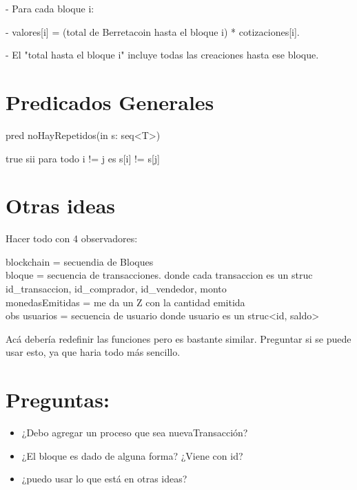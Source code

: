 \documentclass[10pt,a4paper]{article}
\begin{document}
{{    - Para cada bloque i:

    - valores[i] = (total de Berretacoin hasta el bloque i) * cotizaciones[i].

    - El "total hasta el bloque i" incluye todas las creaciones hasta ese bloque.


}


\section{Predicados Generales}
pred noHayRepetidos(in s: seq<T>){

   true sii para todo i != j es s[i] != s[j]
}

\section{Otras ideas}

Hacer todo con 4 observadores:

blockchain = secuendia de Bloques\\

bloque = secuencia de transacciones. donde cada transaccion es un struc \< id_transaccion, id_comprador, id_vendedor, monto \> \\

monedasEmitidas = me da un Z con la cantidad emitida\\

obs usuarios = secuencia de usuario donde usuario es un struc<id, saldo>

Acá debería redefinir las funciones pero es bastante similar. Preguntar si se puede usar esto, ya que haria todo más sencillo.




\section{Preguntas:}

\begin{itemize}
    \item ¿Debo agregar un proceso que sea nuevaTransacción?
    \item ¿El bloque es dado de alguna forma? ¿Viene con id?
    \item ¿puedo usar lo que está en otras ideas?
\end{itemize}

}
\end{document}
